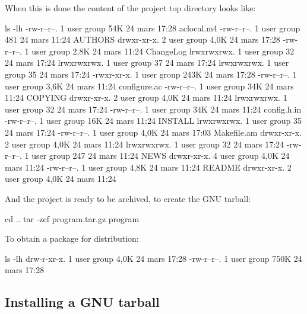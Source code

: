 \vspace{-0.5cm}
When this is done the content of the project top directory looks like:
{\footnotesize{
\begin{script}
 ls -lh
-rw-r--r--.  1 user group  54K 24 mars  17:28 aclocal.m4
-rw-r--r--.  1 user group  481 24 mars  11:24 AUTHORS
drwxr-xr-x.  2 user group 4,0K 24 mars  17:28 
-rw-r--r--.  1 user group 2,8K 24 mars  11:24 ChangeLog
lrwxrwxrwx.  1 user group   32 24 mars  17:24 
lrwxrwxrwx.  1 user group   37 24 mars  17:24 
lrwxrwxrwx.  1 user group   35 24 mars  17:24 
-rwxr-xr-x.  1 user group 243K 24 mars  17:28 
-rw-r--r--.  1 user group 3,6K 24 mars  11:24 configure.ac
-rw-r--r--.  1 user group  34K 24 mars  11:24 COPYING
drwxr-xr-x.  2 user group 4,0K 24 mars  11:24 
lrwxrwxrwx.  1 user group   32 24 mars  17:24 
-rw-r--r--.  1 user group  34K 24 mars  11:24 config.h.in
-rw-r--r--.  1 user group  16K 24 mars  11:24 INSTALL
lrwxrwxrwx.  1 user group   35 24 mars  17:24 
-rw-r--r--.  1 user group 4,0K 24 mars  17:03 Makefile.am
drwxr-xr-x.  2 user group 4,0K 24 mars  11:24 
lrwxrwxrwx.  1 user group   32 24 mars  17:24 
-rw-r--r--.  1 user group  247 24 mars  11:24 NEWS
drwxr-xr-x.  4 user group 4,0K 24 mars  11:24 
-rw-r--r--.  1 user group 4,8K 24 mars  11:24 README
drwxr-xr-x.  2 user group 4,0K 24 mars  11:24 
\end{script}
}}
And the project is ready to be archived, to create the GNU tarball:
{\footnotesize{
\begin{script}
 cd ..
\fprompt{~} tar -zcf program.tar.gz program
\end{script}
}}
To obtain a package for distribution:
{\footnotesize{
\begin{script}
\fprompt{~} ls -lh
drw-r-xr-x.  1 user group  4,0K 24 mars  17:28 
-rw-r--r--.  1 user group  750K 24 mars  17:28 
\end{script}
}}

\subsection{Installing a GNU tarball}

